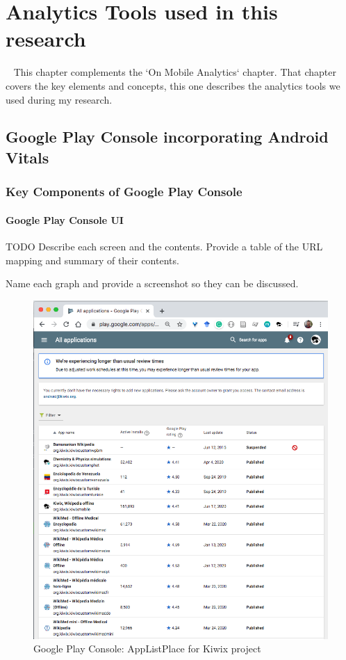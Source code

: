 \chapter{Analytics Tools used in this research}~\label{chapter-analytics-tools}
This chapter complements the `On Mobile Analytics` chapter. That chapter covers the key elements and concepts, this one describes the analytics tools we used during my research.

\section{Google Play Console incorporating Android Vitals}\label{google_play_console_section}

\subsection{Key Components of Google Play Console}
\subsubsection{Google Play Console UI}

TODO Describe each screen and the contents. Provide a table of the URL mapping and summary of their contents.

Name each graph and provide a screenshot so they can be discussed.

\begin{figure}[htbp!]
    \centering
    \includegraphics[width=15cm]{images/android-vitals-screenshots/AppListPlace-kiwix-2020-Jun-17.png}
    \caption{Google Play Console: AppListPlace for Kiwix project}
    \label{fig:gpc-applistplace-kiwix}
\end{figure}

